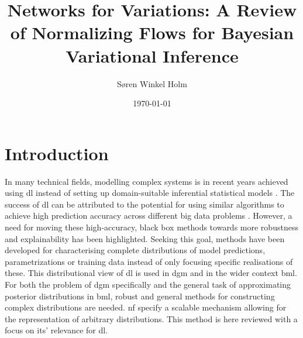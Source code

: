 \documentclass[12pt,fleqn,twocolumn]{article}
\title{Networks for Variations: A Review of Normalizing Flows for Bayesian Variational Inference}
\author{Søren Winkel Holm}
\date{\today}
\begin{document}
\setlength{\headheight}{15pt}
\addtolength{\topmargin}{-2.5pt}

\maketitle
\thispagestyle{fancy}
\section*{Introduction}%
\label{sec:Introduction}
In many technical fields, modelling complex systems is in recent years achieved using \acrfull{dl} instead of setting up domain-suitable inferential statistical models \cite{bzdok2018point, breiman2001stat}.
The success of \acrshort{dl} can be attributed to the potential for using similar algorithms to achieve high prediction accuracy across different big data problems \cite{parloff2016dl}.
However, a need for moving these high-accuracy, black box methods towards more robustness and explainability has been highlighted.
Seeking this goal, methods have been developed for characterising complete distributions of model predictions, parametrizations or training data instead of only focusing specific realisations of these.
This distributional view of \acrshort{dl} is used in \acrfull{dgm} and in the wider context \acrfull{bml}.
For both the problem of \acrshort{dgm} specifically and the general task of approximating posterior distributions in \acrshort{bml}, robust and general methods for constructing complex distributions are needed.
\acrfull{nf} specify a scalable mechanism allowing for the representation of arbitrary distributions.
This method is here reviewed with a focus on its' relevance for \acrshort{dl}.
\end{document}
